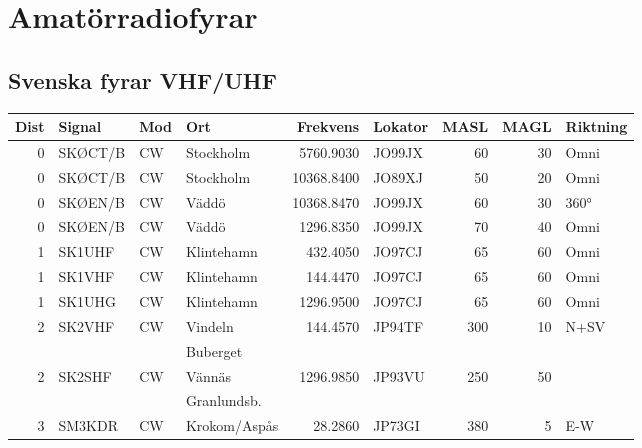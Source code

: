 \clearpage

\section{Amatörradiofyrar}

\subsection{Svenska fyrar VHF/UHF}

\scriptsize

\begin{longtable}{rlllrlrrl}
	\bf Dist & \bf Signal & \bf Mod  & \bf Ort      & \bf Frekvens & \bf Lokator & \bf MASL & \bf MAGL & \bf Riktning \\ \hline
	\endhead
	       0 & SKØCT/B    & CW       & Stockholm    &    5760.9030 & JO99JX      &       60 &       30 & Omni         \\
	       0 & SKØCT/B    & CW       & Stockholm    &   10368.8400 & JO89XJ      &       50 &       20 & Omni         \\
	       0 & SKØEN/B    & CW       & Väddö        &   10368.8470 & JO99JX      &       60 &       30 & 360°         \\
	       0 & SKØEN/B    & CW       & Väddö        &    1296.8350 & JO99JX      &       70 &       40 & Omni         \\
	       1 & SK1UHF     & CW       & Klintehamn   &     432.4050 & JO97CJ      &       65 &       60 & Omni         \\
	       1 & SK1VHF     & CW       & Klintehamn   &     144.4470 & JO97CJ      &       65 &       60 & Omni         \\
	       1 & SK1UHG     & CW       & Klintehamn   &    1296.9500 & JO97CJ      &       65 &       60 & Omni         \\
	       2 & SK2VHF     & CW       & Vindeln      &     144.4570 & JP94TF      &      300 &       10 & N+SV         \\
	         &            &          & Buberget     &              &             &          &          &              \\
	       2 & SK2SHF     & CW       & Vännäs       &    1296.9850 & JP93VU      &      250 &       50 &              \\
	         &            &          & Granlundsb.  &              &             &          &          &              \\
	       3 & SM3KDR     & CW       & Krokom/Aspås &      28.2860 & JP73GI      &      380 &        5 & E-W          \\

\end{longtable}
